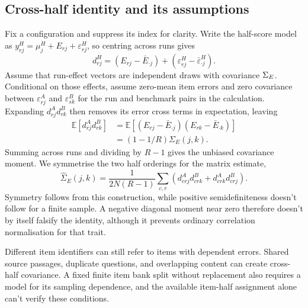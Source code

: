 \subsection{Cross-half identity and its assumptions}
Fix a configuration and suppress its index for clarity. Write the half-score model as $y^H_{rj}=\mu^H_j+E_{rj}+\varepsilon^H_{rj}$, so centring across runs gives
\begin{equation}
d^H_{rj}=(E_{rj}-\bar E_{\cdot j})+(\varepsilon^H_{rj}-\bar\varepsilon^H_{\cdot j}).
\end{equation}
Assume that run-effect vectors are independent draws with covariance $\Sigma_E$. Conditional on those effects, assume zero-mean item errors and zero covariance between $\varepsilon^A_{rj}$ and $\varepsilon^B_{sk}$ for the run and benchmark pairs in the calculation. Expanding $d^A_{rj}d^B_{rk}$ then removes its error cross terms in expectation, leaving
\begin{align}
\mathbb E[d^A_{rj}d^B_{rk}]
&=\mathbb E[(E_{rj}-\bar E_{\cdot j})(E_{rk}-\bar E_{\cdot k})]\\
&=(1-1/R)\Sigma_E(j,k).
\end{align}
Summing across runs and dividing by $R-1$ gives the unbiased covariance moment. We symmetrise the two half orderings for the matrix estimate,
\begin{equation}
\widehat\Sigma_E(j,k)=\frac{1}{2N(R-1)}\sum_{c,r}
\left(d^A_{crj}d^B_{crk}+d^A_{crk}d^B_{crj}\right).
\end{equation}
Symmetry follows from this construction, while positive semidefiniteness doesn't follow for a finite sample. A negative diagonal moment near zero therefore doesn't by itself falsify the identity, although it prevents ordinary correlation normalisation for that trait.

Different item identifiers can still refer to items with dependent errors. Shared source passages, duplicate questions, and overlapping content can create cross-half covariance. A fixed finite item bank split without replacement also requires a model for its sampling dependence, and the available item-half assignment alone can't verify these conditions.

